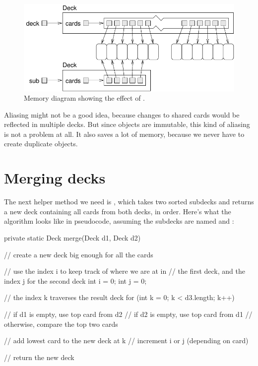 \begin{figure}[!ht]
\begin{center}
\includegraphics{figs/subdeck.pdf}
\caption{Memory diagram showing the effect of .}
\label{fig.subdeck}
\end{center}
\end{figure}


Aliasing might not be a good idea, because changes to shared cards would be reflected in multiple decks.
But since  objects are immutable, this kind of aliasing is not a problem at all.
It also saves a lot of memory, because we never have to create duplicate  objects.


\section{Merging decks}

The next helper method we need is , which takes two sorted subdecks and returns a new deck containing all cards from both decks, in order.
Here's what the algorithm looks like in pseudocode, assuming the subdecks are named  and :

\begin{code}
private static Deck merge(Deck d1, Deck d2) {
    // create a new deck big enough for all the cards

    // use the index i to keep track of where we are at in
    // the first deck, and the index j for the second deck
    int i = 0;
    int j = 0;

    // the index k traverses the result deck
    for (int k = 0; k < d3.length; k++) {

        // if d1 is empty, use top card from d2
        // if d2 is empty, use top card from d1
        // otherwise, compare the top two cards

        // add lowest card to the new deck at k
        // increment i or j (depending on card)
    }
    // return the new deck
}
\end{code}

